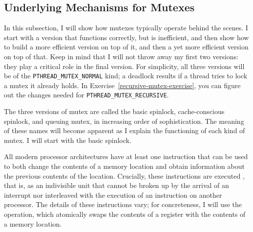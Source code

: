 \subsection{Underlying Mechanisms for Mutexes}\label{mutex-mechanisms-section}

In this subsection, I will show how mutexes typically operate behind
the scenes.  I start with a version that functions correctly, but is
inefficient, and then show how to build a more efficient version on
top of it, and then a yet more efficient version on top of that.  Keep
in mind that I will not throw away my first two versions: they play
a critical role in the final version.  For simplicity, all three
versions will be of the \texttt{PTHREAD\_MUTEX\_NORMAL} kind;
a deadlock results if a thread tries to lock a mutex it already
holds.  In Exercise~\ref{recursive-mutex-exercise},
you can figure out the changes needed for \texttt{PTHREAD\_MUTEX\_RECURSIVE}.

The three versions of mutex are called the basic spinlock,
cache-conscious spinlock, and queuing mutex, in increasing order of
sophistication.  The meaning of these names will become apparent as I
explain the functioning of each kind of mutex.  I will start with the
basic spinlock.

All modern processor architectures have at least one instruction that
can be used to both change the contents of a memory location and
obtain information about the previous contents of the location.
Crucially, these instructions are executed , that is, as
an indivisible unit that cannot be broken up by the arrival of an
interrupt nor interleaved with the execution of an instruction on
another processor.  The details of these instructions vary; for
concreteness, I will use the  operation, which atomically
swaps the contents of a register with the contents of a memory
location.

